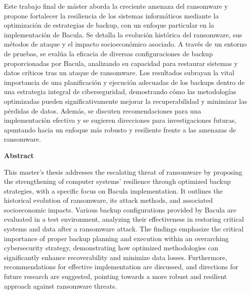 \documentclass[12pt,a4paper]{article}
\begin{document}
Este trabajo final de máster aborda la creciente amenaza del \Gls{ransomware} y propone fortalecer la resiliencia de los sistemas informáticos mediante la optimización de estrategias de backup, con un enfoque particular en la implementación de Bacula. Se detalla la evolución histórica del ransomware, sus métodos de ataque y el impacto socioeconómico asociado. A través de un entorno de pruebas, se evalúa la eficacia de diversas configuraciones de backup proporcionadas por Bacula, analizando su capacidad para restaurar sistemas y datos críticos tras un ataque de ransomware. Los resultados subrayan la vital importancia de una planificación y ejecución adecuadas de los backups dentro de una estrategia integral de ciberseguridad, demostrando cómo las metodologías optimizadas pueden significativamente mejorar la recuperabilidad y minimizar las pérdidas de datos. Además, se discuten recomendaciones para una implementación efectiva y se sugieren direcciones para investigaciones futuras, apuntando hacia un enfoque más robusto y resiliente frente a las amenazas de ransomware.
\medskip

\textbf{Abstract}

This master's thesis addresses the escalating threat of ransomware by proposing the strengthening of computer systems' resilience through optimized backup strategies, with a specific focus on Bacula implementation. It outlines the historical evolution of ransomware, its attack methods, and associated socioeconomic impacts. Various backup configurations provided by Bacula are evaluated in a test environment, analyzing their effectiveness in restoring critical systems and data after a ransomware attack. The findings emphasize the critical importance of proper backup planning and execution within an overarching cybersecurity strategy, demonstrating how optimized methodologies can significantly enhance recoverability and minimize data losses. Furthermore, recommendations for effective implementation are discussed, and directions for future research are suggested, pointing towards a more robust and resilient approach against ransomware threats.


\newpage
\pagestyle{fancy}
\end{document}
